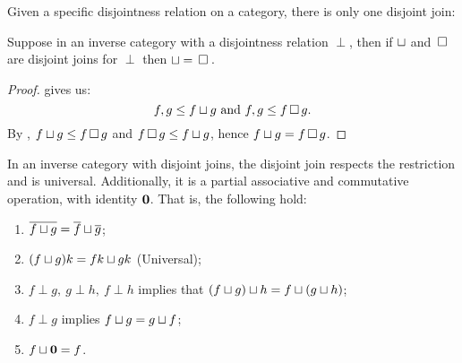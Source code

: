 Given a specific disjointness relation on a category, there is only one disjoint join:
\begin{lemma}\label{lem:disjoint_join_is_unique}
  Suppose \X in an inverse category with a disjointness relation $\perp$, then if  $\sqcup$ and
  $\,\square\,$ are disjoint joins for $\perp$ then $\sqcup = \,\square\,$.
\end{lemma}
\begin{proof}
   gives us:
  \[
    f,g \le f\sqcup g\text{ and }f,g \le f \,\square\, g.
  \]
  By , $f \sqcup g \le f \,\square\, g$ and
  $f \,\square\, g \le f\sqcup g$, hence $f \sqcup g = f \,\square\, g$.
\end{proof}
\begin{lemma}\label{lem:join_is_associative_and_commutative_monoid}
  In an inverse category with disjoint joins, the disjoint join respects the restriction and is
  universal. Additionally, it is a partial associative and
  commutative operation, with identity $\mathbf{0}$. That is, the following hold:
  \begin{enumerate}[{(}i{)}]
    \item $\overline{f\sqcup g} = \overline{f} \sqcup \overline{g}$;
    \item $(f \sqcup g)k = f k \sqcup g k$ (Universal);
    \item $f \perp g,\ g\perp h,\ f\perp h$ implies that $(f\sqcup g)\sqcup h = f\sqcup(g\sqcup
      h)$; \label{lemitem:associative_join}
    \item $f \perp g$ implies $f \sqcup g = g \sqcup f$; \label{lemitem:commutative_join}
    \item $f \sqcup \mathbf{0} = f$. \label{lemitem:identity_for_join}
  \end{enumerate}
\end{lemma}
